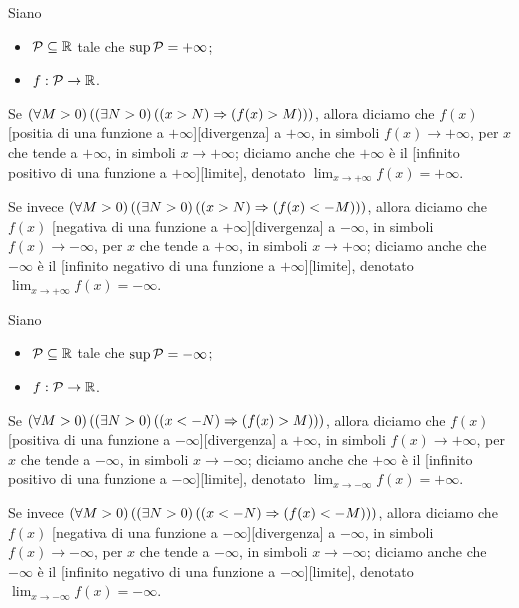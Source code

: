 \begin{Definition}
	Siano
	\begin{itemize}
		\item $\mathcal{P} \subseteq \mathbb{R}$ tale che $\sup{\mathcal{P}} = + \infty$;
		\item $f: \mathcal{P} \rightarrow \mathbb{R}$.
	\end{itemize}
	Se $\left ( \forall M > 0 \right ) \left ( \left ( \exists N > 0 \right ) \left ( \left ( x > N \right ) \Rightarrow \left ( f(x) > M \right ) \right ) \right )$, allora diciamo che $f(x)$ [positia di una funzione a $+\infty$][divergenza] a $+\infty$, in simboli $f(x) \rightarrow +\infty$, per $x$ che tende a $+\infty$, in simboli $x \rightarrow +\infty$; diciamo anche che $+\infty$ \`e il [infinito positivo di una funzione a $+\infty$][limite], denotato $\lim_{x \rightarrow +\infty} f(x) = +\infty$.
	\par Se invece $\left ( \forall M > 0 \right ) \left ( \left ( \exists N > 0 \right ) \left ( \left ( x > N \right ) \Rightarrow \left ( f(x) < - M \right ) \right ) \right )$, allora diciamo che $f(x)$ [negativa di una funzione a $+\infty$][divergenza] a $-\infty$, in simboli $f(x) \rightarrow -\infty$, per $x$ che tende a $+\infty$, in simboli $x \rightarrow +\infty$; diciamo anche che $-\infty$ \`e il [infinito negativo di una funzione a $+\infty$][limite], denotato $\lim_{x \rightarrow +\infty} f(x) = -\infty$.
\end{Definition}
\begin{Definition}
	Siano
	\begin{itemize}
		\item $\mathcal{P} \subseteq \mathbb{R}$ tale che $\sup{\mathcal{P}} = - \infty$;
		\item $f: \mathcal{P} \rightarrow \mathbb{R}$.
	\end{itemize}
	Se $\left ( \forall M > 0 \right ) \left ( \left ( \exists N > 0 \right ) \left ( \left ( x < - N \right ) \Rightarrow \left ( f(x) > M \right ) \right ) \right )$, allora diciamo che $f(x)$ [positiva di una funzione a $-\infty$][divergenza] a $+\infty$, in simboli $f(x) \rightarrow +\infty$, per $x$ che tende a $-\infty$, in simboli $x \rightarrow -\infty$; diciamo anche che $+\infty$ \`e il [infinito positivo di una funzione a $-\infty$][limite], denotato $\lim_{x \rightarrow -\infty} f(x) = +\infty$.
	\par Se invece $\left ( \forall M > 0 \right ) \left ( \left ( \exists N > 0 \right ) \left ( \left ( x < - N \right ) \Rightarrow \left ( f(x) < - M \right ) \right ) \right )$, allora diciamo che $f(x)$ [negativa di una funzione a $-\infty$][divergenza] a $-\infty$, in simboli $f(x) \rightarrow -\infty$, per $x$ che tende a $-\infty$, in simboli $x \rightarrow -\infty$; diciamo anche che $-\infty$ \`e il [infinito negativo di una funzione a $-\infty$][limite], denotato $\lim_{x \rightarrow -\infty} f(x) = -\infty$.
\end{Definition}
